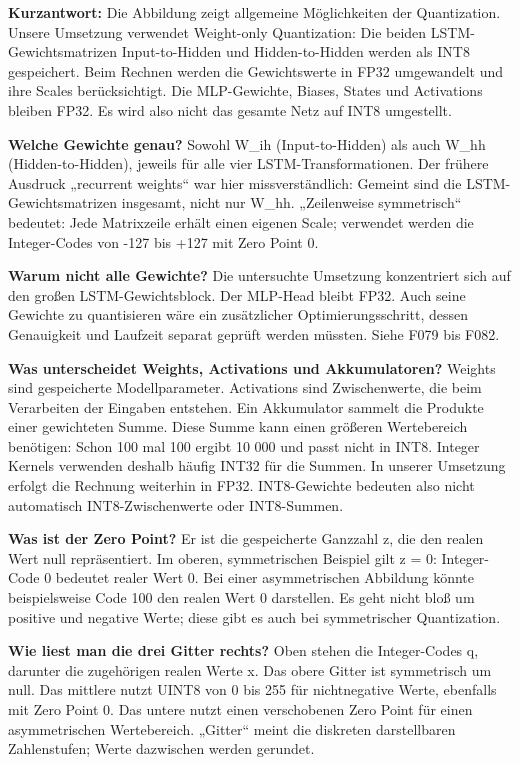 \documentclass[11pt,a4paper]{article}
\begin{document}
\textbf{Kurzantwort:} Die Abbildung zeigt allgemeine Möglichkeiten der Quantization. Unsere Umsetzung verwendet Weight-only Quantization: Die beiden LSTM-Gewichtsmatrizen Input-to-Hidden und Hidden-to-Hidden werden als INT8 gespeichert. Beim Rechnen werden die Gewichtswerte in FP32 umgewandelt und ihre Scales berücksichtigt. Die MLP-Gewichte, Biases, States und Activations bleiben FP32. Es wird also nicht das gesamte Netz auf INT8 umgestellt.

\textbf{Welche Gewichte genau?} Sowohl W\_\allowbreak{}ih (Input-to-Hidden) als auch W\_\allowbreak{}hh (Hidden-to-Hidden), jeweils für alle vier LSTM-Transformationen. Der frühere Ausdruck „recurrent weights“ war hier missverständlich: Gemeint sind die LSTM-Gewichtsmatrizen insgesamt, nicht nur W\_\allowbreak{}hh. „Zeilenweise symmetrisch“ bedeutet: Jede Matrixzeile erhält einen eigenen Scale; verwendet werden die Integer-Codes von -127 bis +127 mit Zero Point 0.

\textbf{Warum nicht alle Gewichte?} Die untersuchte Umsetzung konzentriert sich auf den großen LSTM-Gewichtsblock. Der MLP-Head bleibt FP32. Auch seine Gewichte zu quantisieren wäre ein zusätzlicher Optimierungsschritt, dessen Genauigkeit und Laufzeit separat geprüft werden müssten. Siehe F079 bis F082.

\textbf{Was unterscheidet Weights, Activations und Akkumulatoren?} Weights sind gespeicherte Modellparameter. Activations sind Zwischenwerte, die beim Verarbeiten der Eingaben entstehen. Ein Akkumulator sammelt die Produkte einer gewichteten Summe. Diese Summe kann einen größeren Wertebereich benötigen: Schon 100 mal 100 ergibt 10 000 und passt nicht in INT8. Integer Kernels verwenden deshalb häufig INT32 für die Summen. In unserer Umsetzung erfolgt die Rechnung weiterhin in FP32. INT8-Gewichte bedeuten also nicht automatisch INT8-Zwischenwerte oder INT8-Summen.

\textbf{Was ist der Zero Point?} Er ist die gespeicherte Ganzzahl z, die den realen Wert null repräsentiert. Im oberen, symmetrischen Beispiel gilt z = 0: Integer-Code 0 bedeutet realer Wert 0. Bei einer asymmetrischen Abbildung könnte beispielsweise Code 100 den realen Wert 0 darstellen. Es geht nicht bloß um positive und negative Werte; diese gibt es auch bei symmetrischer Quantization.

\textbf{Wie liest man die drei Gitter rechts?} Oben stehen die Integer-Codes q, darunter die zugehörigen realen Werte x. Das obere Gitter ist symmetrisch um null. Das mittlere nutzt UINT8 von 0 bis 255 für nichtnegative Werte, ebenfalls mit Zero Point 0. Das untere nutzt einen verschobenen Zero Point für einen asymmetrischen Wertebereich. „Gitter“ meint die diskreten darstellbaren Zahlenstufen; Werte dazwischen werden gerundet.
\end{document}
